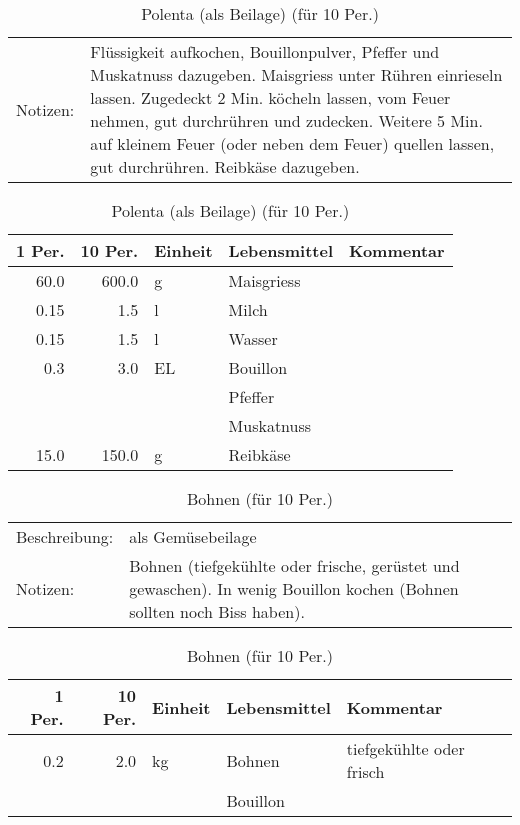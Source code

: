 \documentclass[11pt,a4paper]{article}%
\begin{document}
\begin{table}[h]%
\caption{Polenta (als Beilage) (für 10 Per.)}%
\begin{tabularx}{\textwidth}{l X}%
Notizen:&Flüssigkeit aufkochen, Bouillonpulver, Pfeffer und Muskatnuss dazugeben. Maisgriess unter Rühren einrieseln lassen. Zugedeckt 2 Min. köcheln lassen, vom Feuer nehmen, gut durchrühren und zudecken. Weitere 5 Min. auf kleinem Feuer (oder neben dem Feuer) quellen lassen, gut durchrühren. Reibkäse dazugeben.\\%
\end{tabularx}%
\par%
\begin{tabularx}{\textwidth}{| r | r | l | l | X |}%
\hline%
\tiny{1 Per.}&\tiny{10 Per.}&\tiny{Einheit}&\tiny{Lebensmittel}&\tiny{Kommentar}\\%
\hline%
60.0&600.0&g&Maisgriess&\\%
\hline%
0.15&1.5&l&Milch&\\%
\hline%
0.15&1.5&l&Wasser&\\%
\hline%
0.3&3.0&EL&Bouillon&\\%
\hline%
&&&Pfeffer&\\%
\hline%
&&&Muskatnuss&\\%
\hline%
15.0&150.0&g&Reibkäse&\\%
\hline%
\end{tabularx}%
\end{table}

%
\vspace{0.75cm}%
\renewcommand{\arraystretch}{1.25}%


\begin{table}[h]%
\caption{Bohnen  (für 10 Per.)}%
\begin{tabularx}{\textwidth}{l X}%
Beschreibung: &als Gemüsebeilage\\%
Notizen:&Bohnen (tiefgekühlte oder frische, gerüstet und gewaschen). In wenig Bouillon kochen (Bohnen sollten noch Biss haben).\\%
\end{tabularx}%
\par%
\begin{tabularx}{\textwidth}{| r | r | l | l | X |}%
\hline%
\tiny{1 Per.}&\tiny{10 Per.}&\tiny{Einheit}&\tiny{Lebensmittel}&\tiny{Kommentar}\\%
\hline%
0.2&2.0&kg&Bohnen&tiefgekühlte oder frisch\\%
\hline%
&&&Bouillon&\\%
\hline%
\end{tabularx}%
\end{table}
\end{document}
